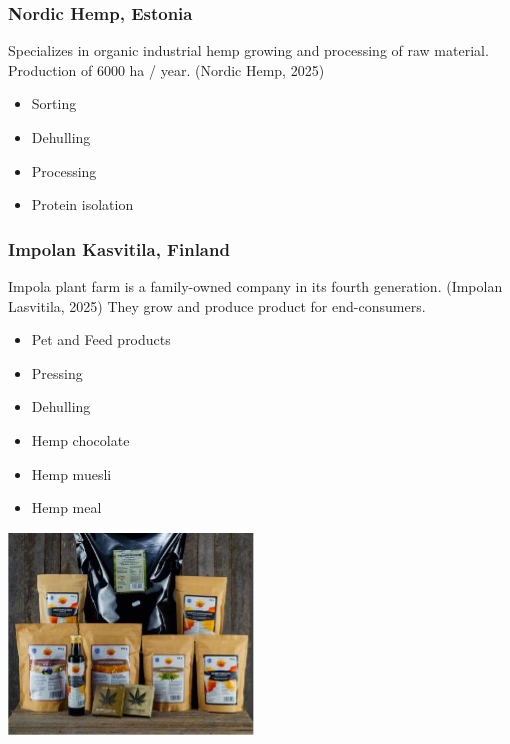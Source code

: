 \subsubsection*{Nordic Hemp, Estonia}
Specializes in organic industrial hemp growing and processing of raw material. Production of 6000 ha / year. (Nordic Hemp, 2025)
\begin{itemize}
    \item Sorting
    \item Dehulling
    \item Processing
    \item Protein isolation
\end{itemize}

\subsubsection*{Impolan Kasvitila, Finland}
Impola plant farm is a family-owned company in its fourth generation. (Impolan Lasvitila, 2025)
They grow and produce product for end-consumers. 

\begin{minipage}{0.6\textwidth}
    \begin{itemize}
        \item Pet and Feed products
        \item Pressing
        \item Dehulling
        \item Hemp chocolate
        \item Hemp muesli
        \item Hemp meal
    \end{itemize}
    \end{minipage}%
    \hfill
    \begin{minipage}{0.35\textwidth}
        \centering
        \includegraphics[width=\linewidth]{Figures/fig_02.jpg}
        \label{fig:introduction_02}
    \end{minipage}

